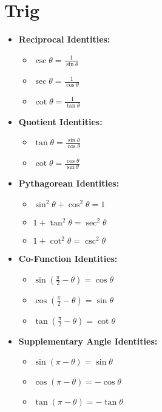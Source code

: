 \documentclass[letterpaper,12pt]{article}
\begin{document}
    \section{Trig}
    \begin{itemize}
        \item \textbf{Reciprocal Identities:}
            \begin{itemize}
            \item $\csc \theta = \frac{1}{\sin \theta}$
            \item $\sec \theta = \frac{1}{\cos \theta}$
            \item $\cot \theta = \frac{1}{\tan \theta}$
            \end{itemize}
        
        \item \textbf{Quotient Identities:}
            \begin{itemize}
            \item $\tan \theta = \frac{\sin \theta}{\cos \theta}$
            \item $\cot \theta = \frac{\cos \theta}{\sin \theta}$
            \end{itemize}
        
        \item \textbf{Pythagorean Identities:}
            \begin{itemize}
            \item $\sin^2 \theta + \cos^2 \theta = 1$
            \item $1 + \tan^2 \theta = \sec^2 \theta$
            \item $1 + \cot^2 \theta = \csc^2 \theta$
            \end{itemize}
        
        \item \textbf{Co-Function Identities:}
            \begin{itemize}
            \item $\sin (\frac{\pi}{2} - \theta) = \cos \theta$
            \item $\cos (\frac{\pi}{2} - \theta) = \sin \theta$
            \item $\tan (\frac{\pi}{2} - \theta) = \cot \theta$
            \end{itemize}
        \item \textbf{Supplementary Angle Identities:}
            \begin{itemize}
            \item $\sin(\pi - \theta) = \sin \theta$
            \item $\cos(\pi - \theta) = -\cos \theta$
            \item $\tan(\pi - \theta) = -\tan \theta$
            \end{itemize}


\end{itemize}
\end{document}
